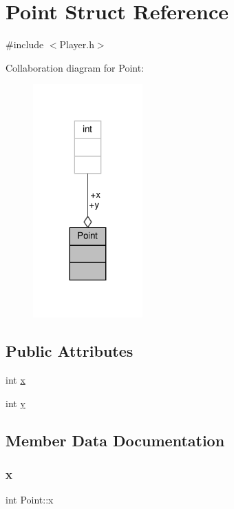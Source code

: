 \hypertarget{structPoint}{}\section{Point Struct Reference}
\label{structPoint}


{\ttfamily \#include $<$Player.\+h$>$}



Collaboration diagram for Point\+:
\nopagebreak
\begin{figure}[H]
\begin{center}
\leavevmode
\includegraphics[width=119pt]{structPoint__coll__graph}
\end{center}
\end{figure}
\subsection*{Public Attributes}
\begin{DoxyCompactItemize}
\item 
int \hyperlink{structPoint_a8c779e11e694b20e0946105a9f5de842}{x}
\item 
int \hyperlink{structPoint_a2e1b5fb2b2a83571f5c0bc0f66a73cf7}{y}
\end{DoxyCompactItemize}


\subsection{Member Data Documentation}
\mbox{\label{structPoint_a8c779e11e694b20e0946105a9f5de842}} 
\subsubsection{\texorpdfstring{x}{x}}
{\footnotesize\ttfamily int Point\+::x}

